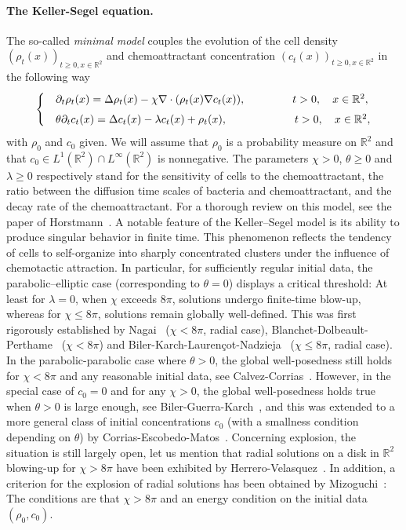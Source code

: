 \documentclass[11pt]{article}
\newcommand{\R}{\mathbb{R}}
\newcommand{\1}{\mathbbm{1}}
\begin{document}
\paragraph{The Keller-Segel equation.} The so-called \textit{minimal model} couples the evolution of the cell density $(\rho_t(x))_{t\geq 0, x \in \R^2}$ and chemoattractant concentration $(c_t(x))_{t\geq 0, x \in \R^2}$ in the following way
\begin{equation}
\label{EDP_KS}
\begin{cases}
&\partial_t \rho_t(x) = \Delta  \rho_t(x)-\chi \nabla \cdot (\rho_t(x)\nabla c_t(x)), 
\hskip1.5cm  t>0,\quad x\in\R^2, \\[4pt]
&\theta \partial_t c_t(x) = \Delta c_t(x)-\lambda c_t(x)+\rho_t(x), \hskip2.15cm t>0, \quad x\in\R^2,
\end{cases}
\end{equation}
with $\rho_0$ and $c_0$ given.  We will assume that $\rho_0$ is a probability measure on $\R^2$ and that
$c_0\in L^1(\R^2)\cap L^\infty(\R^2)$ is nonnegative.
The parameters $\chi>0$, $\theta\geq 0$ and 
$\lambda\geq 0$ respectively stand for the sensitivity of cells to the chemoattractant, the ratio between the diffusion time scales of bacteria and chemoattractant, and the decay rate of the chemoattractant. For a thorough review on this model, see the paper of Horstmann~\cite{Horstmann1}.
A notable feature of the Keller–Segel model is its ability to produce singular behavior in finite time. This phenomenon reflects the tendency of cells to self-organize into sharply concentrated clusters under the influence of chemotactic attraction. In particular, for sufficiently regular initial data, the parabolic–elliptic case (corresponding to $\theta = 0$) displays a critical threshold: At least for $\lambda=0$, when $\chi$ exceeds $8\pi$, solutions undergo finite-time blow-up, whereas for $\chi \leq 8\pi$, solutions remain globally well-defined. This was first rigorously established by Nagai~\cite{nagai} ($\chi<8\pi$, radial case),
Blanchet-Dolbeault-Perthame~\cite{bdp} ($\chi<8\pi$) and Biler-Karch-Lauren\c{c}ot-Nadzieja~\cite{bkln} 
($\chi\leq 8\pi$, radial case). In the parabolic-parabolic case where $\theta>0$, the  global well-posedness still holds for $\chi<8\pi$ and any reasonable initial data, see Calvez-Corrias~\cite{CalCor2008}. However, in the special case of $c_0= 0$ and for any $\chi>0$,
the global well-posedness holds true when $\theta>0$ is large enough, see  Biler-Guerra-Karch~\cite{Biler-Guerra-Karch}, and this was extended to a more general class of initial  concentrations $c_0$ (with a smallness condition depending on $\theta$) by  
Corrias-Escobedo-Matos~\cite{Corrias2014}. 
Concerning explosion, the situation is still largely open, let us mention that radial solutions 
on a disk in $\R^2$ blowing-up for $\chi>8\pi$  have been  exhibited by  Herrero-Velasquez~\cite{HerreroandVelazquez}.  In addition, a criterion for the explosion of radial solutions has been obtained by Mizoguchi~\cite{mizoguchiBlowUp}: The conditions are that $\chi>8\pi$ and  an energy condition on the initial data $(\rho_0,c_0)$. 
\end{document}
